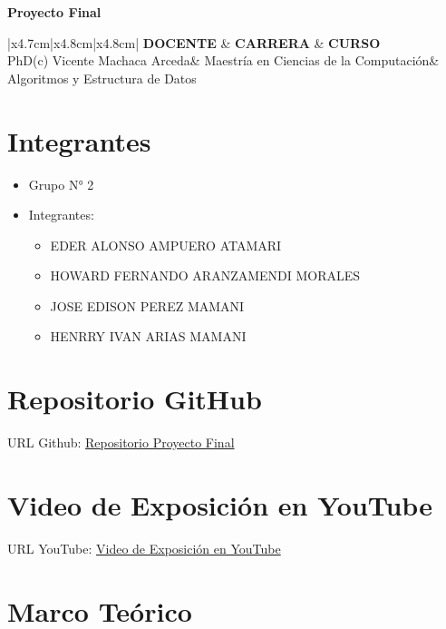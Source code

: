 \documentclass{article}
\newcommand{\csdocente}{PhD(c) Vicente Machaca Arceda}
\newcommand{\cscurso}{Algoritmos y Estructura de Datos}
\newcommand{\csescuela}{Maestría en Ciencias de la Computación}
\begin{document}
\vspace*{10px}

\begin{center}
	\fontsize{17}{17} \textbf{Proyecto Final}
\end{center}


\begin{table}[h]
	\begin{tabular}{|x{4.7cm}|x{4.8cm}|x{4.8cm}|}
		\hline
		\textbf{DOCENTE} & \textbf{CARRERA} & \textbf{CURSO} \\
		\hline
		\csdocente       & \csescuela       & \cscurso       \\
		\hline
	\end{tabular}
\end{table}

\section{Integrantes}
\begin{itemize}
	\item Grupo N° 2
	\item Integrantes:
	      \begin{itemize}
		      \item EDER ALONSO AMPUERO ATAMARI
		      \item HOWARD FERNANDO ARANZAMENDI MORALES
		      \item JOSE EDISON PEREZ MAMANI
		      \item HENRRY IVAN ARIAS MAMANI
	      \end{itemize}
\end{itemize}

\section{Repositorio GitHub}
URL Github: \href{https://github.com/hAriasm/ProyectoFinal}{Repositorio Proyecto Final}

\section{Video de Exposición en YouTube}
URL YouTube: \href{https://youtube.com}{Video de Exposición en YouTube}

\clearpage
\section{Marco Teórico}
\end{document}
